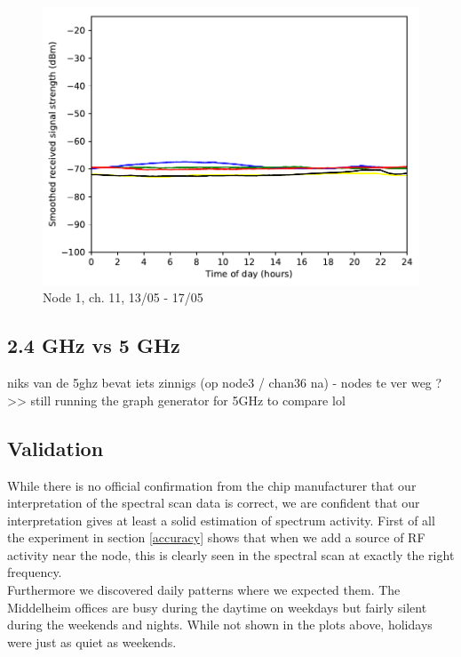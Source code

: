 \documentclass[a4paper, 11pt]{article}
\begin{document}
\begin{figure}[h!]
\begin{minipage}{0.47\textwidth}
    \centering
	\includegraphics[width=\textwidth]{images/2_4_GHz/node1_2017-05-17_chan11_image}
    \caption{Node 1, ch. 11, 13/05 - 17/05} \label{node1-11}
\end{minipage}\hfill
\end{figure}
\subsection{2.4 GHz vs 5 GHz}
niks van de 5ghz bevat iets zinnigs (op node3 / chan36 na) - nodes te ver weg ?
>> still running the graph generator for 5GHz to compare lol
\subsection{Validation}
While there is no official confirmation from the chip manufacturer that our interpretation of the spectral scan data is correct, we are confident that our interpretation gives at least a solid estimation of spectrum activity. First of all the experiment in section \ref{accuracy} shows that when we add a source of RF activity near the node, this is clearly seen in the spectral scan at exactly the right frequency. \\
Furthermore we discovered daily patterns where we expected them. The Middelheim offices are busy during the daytime on weekdays but fairly silent during the weekends and nights. While not shown in the plots above, holidays were just as quiet as weekends.
\end{document}
